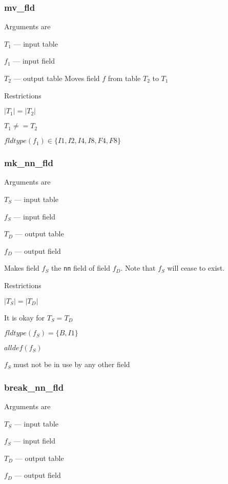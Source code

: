 \documentclass{report}
\begin{document}
\subsubsection{mv\_fld}
\label{mv_fld}

Arguments are
\be
\item \(T_1\) --- input table 
\item \(f_1\) --- input field 
\item \(T_2\) --- output table 
\ee
Moves field \(f\) from table \(T_2\) to \(T_1\)

Restrictions
\be
\item \(|T_1| = |T_2|\)
\item \(T_1 \neq = T_2\)
\item \(fldtype(f_1) \in \{I1, I2, I4, I8, F4, F8\}\)
\ee

\subsubsection{mk\_nn\_fld}
\label{mk_nn_fld}

Arguments are
\be
\item \(T_S\) --- input table 
\item \(f_S\) --- input field 
\item \(T_D\) --- output table 
\item \(f_D\) --- output field 
\ee

Makes field \(f_S\) the {\tt nn} field of field \(f_D\). Note that
\(f_S\) will cease to exist.

Restrictions
\be
\item \(|T_S| = |T_D|\)
\item It is okay for \(T_S = T_D\)
\item \(fldtype(f_S) = \{B, I1\} \) 
\item \(alldef(f_S)\)
\item \(f_S\) must not be in use by any other field 
\ee

\subsubsection{break\_nn\_fld}
\label{break_nn_fld}

Arguments are
\be
\item \(T_S\) --- input table 
\item \(f_S\) --- input field 
\item \(T_D\) --- output table 
\item \(f_D\) --- output field 
\ee
\end{document}

